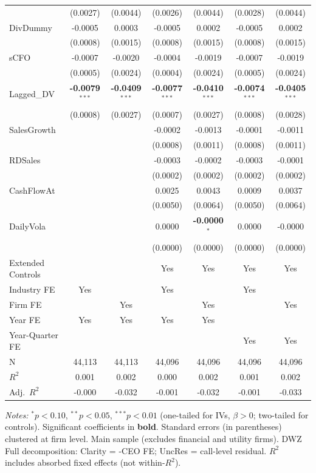 \documentclass[11pt,a4paper]{article}
\begin{document}
\begin{table}[htbp]
\begin{tabular}{lcccccc}
 & (0.0027) & (0.0044) & (0.0026) & (0.0044) & (0.0028) & (0.0044) \\
DivDummy & -0.0005 & 0.0003 & -0.0005 & 0.0002 & -0.0005 & 0.0002 \\
 & (0.0008) & (0.0015) & (0.0008) & (0.0015) & (0.0008) & (0.0015) \\
sCFO & -0.0007 & -0.0020 & -0.0004 & -0.0019 & -0.0007 & -0.0019 \\
 & (0.0005) & (0.0024) & (0.0004) & (0.0024) & (0.0005) & (0.0024) \\
Lagged\_DV & \textbf{-0.0079}$^{***}$ & \textbf{-0.0409}$^{***}$ & \textbf{-0.0077}$^{***}$ & \textbf{-0.0410}$^{***}$ & \textbf{-0.0074}$^{***}$ & \textbf{-0.0405}$^{***}$ \\
 & (0.0008) & (0.0027) & (0.0007) & (0.0027) & (0.0008) & (0.0028) \\
SalesGrowth &  &  & -0.0002 & -0.0013 & -0.0001 & -0.0011 \\
 &  &  & (0.0008) & (0.0011) & (0.0008) & (0.0011) \\
RDSales &  &  & -0.0003 & -0.0002 & -0.0003 & -0.0001 \\
 &  &  & (0.0002) & (0.0002) & (0.0002) & (0.0002) \\
CashFlowAt &  &  & 0.0025 & 0.0043 & 0.0009 & 0.0037 \\
 &  &  & (0.0050) & (0.0064) & (0.0050) & (0.0064) \\
DailyVola &  &  & 0.0000 & \textbf{-0.0000}$^{*}$ & 0.0000 & -0.0000 \\
 &  &  & (0.0000) & (0.0000) & (0.0000) & (0.0000) \\
\midrule
Extended Controls &  &  & Yes & Yes & Yes & Yes \\
Industry FE & Yes &  & Yes &  & Yes &  \\
Firm FE &  & Yes &  & Yes &  & Yes \\
Year FE & Yes & Yes & Yes & Yes &  &  \\
Year-Quarter FE &  &  &  &  & Yes & Yes \\
\midrule
N & 44,113 & 44,113 & 44,096 & 44,096 & 44,096 & 44,096 \\
$R^2$ & 0.001 & 0.002 & 0.000 & 0.002 & 0.001 & 0.002 \\
Adj.~$R^2$ & -0.000 & -0.032 & -0.001 & -0.032 & -0.001 & -0.033 \\
\bottomrule
\end{tabular}
\begin{minipage}{\linewidth}
\vspace{2pt}\scriptsize
\textit{Notes:} $^{*}p<0.10$, $^{**}p<0.05$, $^{***}p<0.01$ (one-tailed for IVs, $\beta > 0$; two-tailed for controls).
 Significant coefficients in \textbf{bold}.
 Standard errors (in parentheses) clustered at firm level.
 Main sample (excludes financial and utility firms). DWZ Full decomposition: Clarity = -CEO FE; UncRes = call-level residual.
 $R^2$ includes absorbed fixed effects (not within-$R^2$).
\end{minipage}
\end{table}
\end{document}
